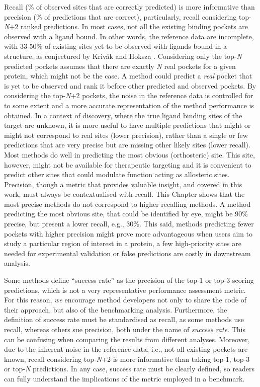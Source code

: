 Recall (\% of observed sites that are correctly predicted) is more informative than precision (\% of predictions that are correct), particularly, recall considering top-\textit{N}+2 ranked predictions. In most cases, not all the existing binding pockets are observed with a ligand bound. In other words, the reference data are incomplete, with 33-50\% of existing sites yet to be observed with ligands bound in a structure, as conjectured by Krivák and Hoksza \cite{KRIVAK_2018_P2RANK}. Considering only the top-\textit{N} predicted pockets assumes that there are exactly \textit{N} real pockets for a given protein, which might not be the case. A method could predict a \textit{real} pocket that is yet to be observed and rank it before other predicted and observed pockets. By considering the top-\textit{N}+2 pockets, the noise in the reference data is controlled for to some extent and a more accurate representation of the method performance is obtained. In a context of discovery, where the true ligand binding sites of the target are unknown, it is more useful to have multiple predictions that might or might not correspond to real sites (lower precision), rather than a single or few predictions that are very precise but are missing other likely sites (lower recall). Most methods do well in predicting the most obvious (orthosteric) site. This site, however, might not be available for therapeutic targeting and it is convenient to predict other sites that could modulate function acting as allosteric sites. Precision, though a metric that provides valuable insight, and covered in this work, must always be contextualised with recall. This Chapter shows that the most precise methods do not correspond to higher recalling methods. A method predicting the most obvious site, that could be identified by eye, might be 90\% precise, but present a lower recall, e.g., 30\%. This said, methods predicting fewer pockets with higher precision might prove more advantageous when users aim to study a particular region of interest in a protein, a few high-priority sites are needed for experimental validation or false predictions are costly in downstream analysis. 

Some methods define ``success rate'' as the precision of the top-1 or top-3 scoring predictions, which is not a very representative performance assessment metric. For this reason, \textit{we} encourage method developers not only to share the code of their approach, but also of the benchmarking analysis. Furthermore, the definition of success rate must be standardised as recall, as some methods use recall, whereas others sue precision, both under the name of \textit{success rate}. This can be confusing when comparing the results from different analyses. Moreover, due to the inherent noise in the reference data, i.e., not all existing pockets are known, recall considering top-\textit{N}+2 is more informative than taking top-1, top-3 or top-\textit{N} predictions. In any case, success rate must be clearly defined, so readers can fully understand the implications of the metric employed in a benchmark.

